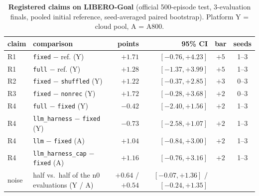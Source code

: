 \begin{table}[h]
  \centering
  \small
  \caption{\textbf{Registered claims on LIBERO-Goal} (official 500-episode test, 3-evaluation finals, pooled initial reference, seed-averaged paired bootstrap). Platform Y = cloud pool, A = A800.}
  \label{tab:goal}
  \begin{tabular}{@{}llrrcc@{}}
    \toprule
    claim & comparison & points & 95\% CI & bar & seeds \\
    \midrule
    R1 & \texttt{fixed} $-$ ref. (Y) & $+1.71$ & $[-0.76, +4.23]$ & $+5$ & 1--3 \\
    R1 & \texttt{full} $-$ ref. (Y) & $+1.28$ & $[-1.37, +3.99]$ & $+5$ & 1--3 \\
    R2 & \texttt{fixed} $-$ \texttt{shuffled} (Y) & $+1.22$ & $[-0.37, +2.85]$ & $+3$ & 0--3 \\
    R3 & \texttt{fixed} $-$ \texttt{nonrec} (Y) & $+1.72$ & $[-0.28, +3.68]$ & $+2$ & 0--3 \\
    R4 & \texttt{full} $-$ \texttt{fixed} (Y) & $-0.42$ & $[-2.40, +1.56]$ & $+2$ & 1--3 \\
    R4 & \texttt{llm\_harness} $-$ \texttt{fixed} (Y) & $-0.73$ & $[-2.58, +1.07]$ & $+2$ & 1--3 \\
    R4 & \texttt{llm} $-$ \texttt{fixed} (A) & $+1.04$ & $[-0.84, +3.00]$ & $+2$ & 1--3 \\
    R4 & \texttt{llm\_harness\_cap} $-$ \texttt{fixed} (A) & $+1.16$ & $[-0.76, +3.16]$ & $+2$ & 1--3 \\
    \midrule
    noise & half vs.\ half of the n0 evaluations (Y / A) & $+0.64$ / $+0.54$ & $[-0.07, +1.36]$ / $[-0.24, +1.35]$ & & \\
    \bottomrule
  \end{tabular}
\end{table}
